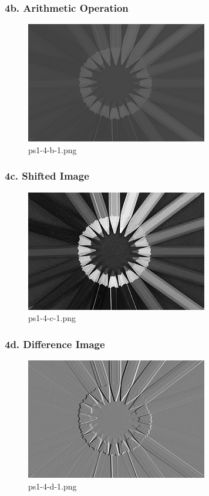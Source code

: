 	\begin{frame}
		\frametitle{4b. Arithmetic Operation}
		
		\begin{figure}[!htb]
			\centering
			\includegraphics[height=0.65\textheight]{./output/ps1-4-b-1.png}
			\caption{ps1-4-b-1.png} 
		\end{figure}	
		
	\end{frame}

	\begin{frame}
		\frametitle{4c. Shifted Image}
		
		\begin{figure}[!htb]
			\centering
			\includegraphics[height=0.65\textheight]{./output/ps1-4-c-1.png}
			\caption{ps1-4-c-1.png} 
		\end{figure}	
		
	\end{frame}	

	\begin{frame}
		\frametitle{4d. Difference Image}
		
		\begin{figure}[!htb]
			\centering
			\includegraphics[height=0.65\textheight]{./output/ps1-4-d-1.png}
			\caption{ps1-4-d-1.png} 
		\end{figure}	
		
	\end{frame}

